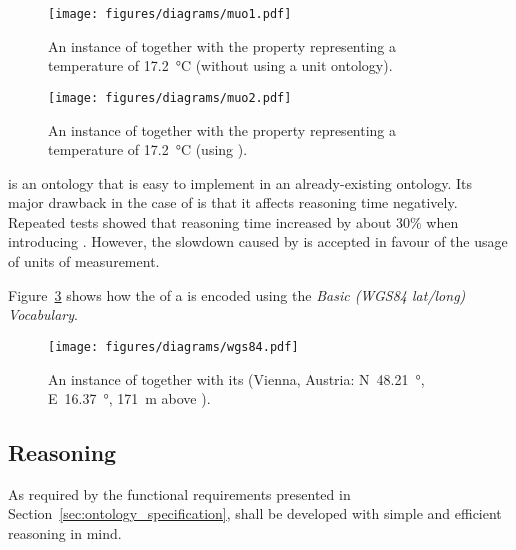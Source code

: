 \begin{figure}
  \centering
  \texttt{[image: figures/diagrams/muo1.pdf]}
  \caption[An instance of  without units]{An instance of  together with the property  representing a temperature of \SI{17.2}{\celsius} (without using a unit ontology).}
  \label{fig:muo1}
\end{figure}

\begin{figure}
  \centering
  \texttt{[image: figures/diagrams/muo2.pdf]}
  \caption[An instance of  using \muo]{An instance of  together with the property  representing a temperature of \SI{17.2}{\celsius} (using \muo).}
  \label{fig:muo2}
\end{figure}

\muo is an ontology that is easy to implement in an already-existing ontology. Its major drawback in the case of \smarthomeweather is that it affects reasoning time negatively. Repeated tests showed that reasoning time increased by about $30 \%$ when introducing \muo. However, the slowdown caused by \muo is accepted in favour of the usage of units of measurement.

\vspace{1em}

Figure~\ref{fig:owl_wgs84} shows how the  of a  is encoded using the \emph{Basic (WGS84 lat/long) Vocabulary}.

\begin{figure}
  \centering
  \texttt{[image: figures/diagrams/wgs84.pdf]}
  \caption[An instance of  together with its ]{An instance of  together with its  (Vienna, Austria: N~\SI{48.21}{\degree}, E~\SI{16.37}{\degree}, \SI{171}{\metre} above ).}
  \label{fig:owl_wgs84}
\end{figure}

\subsection{Reasoning}
\label{sec:reasoning}

As required by the functional requirements presented in Section~\ref{sec:ontology_specification}, \smarthomeweather shall be developed with simple and efficient  reasoning in mind.


